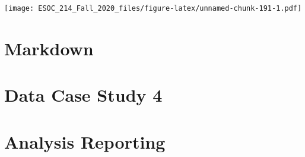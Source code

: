 \documentclass[
]{book}
\begin{document}
\texttt{[image: ESOC\_214\_Fall\_2020\_files/figure-latex/unnamed-chunk-191-1.pdf]}

\hypertarget{markdown}{%
\chapter{Markdown}\label{markdown}}

\hypertarget{data-case-study-4}{%
\chapter{Data Case Study 4}\label{data-case-study-4}}

\hypertarget{analysis-reporting}{%
\chapter{Analysis Reporting}\label{analysis-reporting}}

  
\end{document}
